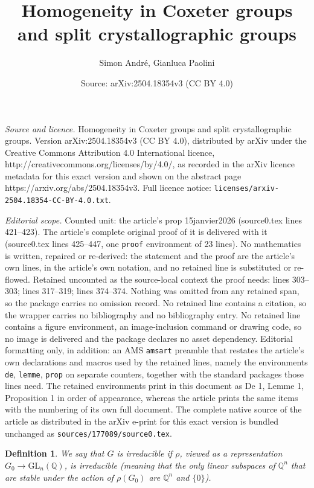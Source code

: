 \documentclass[10pt,a4paper]{amsart}
\title{Homogeneity in Coxeter groups and split crystallographic groups}
\author{Simon Andr{\' e}, Gianluca Paolini}
\date{Source: arXiv:2504.18354v3 (CC BY 4.0)}
\newtheorem{de}{Definition}
\begin{document}
\maketitle

\noindent\emph{Source and licence.} Homogeneity in Coxeter groups and split crystallographic groups. Version arXiv:2504.18354v3 (CC BY 4.0), distributed by arXiv under the Creative Commons Attribution 4.0 International licence, http://creativecommons.org/licenses/by/4.0/, as recorded in the arXiv licence metadata for this exact version and shown on the abstract page https://arxiv.org/abs/2504.18354v3. Full licence notice: \texttt{licenses/arxiv-2504.18354-CC-BY-4.0.txt}.\par\smallskip

\noindent\textit{Editorial scope.} Counted unit: the article's prop 15janvier2026 (source0.tex lines 421--423). The article's complete original proof of it is delivered with it (source0.tex lines 425--447, one \texttt{proof} environment of 23 lines). No mathematics is written, repaired or re-derived: the statement and the proof are the article's own lines, in the article's own notation, and no retained line is substituted or re-flowed.  Retained uncounted as the source-local context the proof needs: lines 303--303; lines 317--319; lines 374--374.  Nothing was omitted from any retained span, so the package carries no omission record.  No retained line contains a citation, so the wrapper carries no bibliography and no bibliography entry.  No retained line contains a figure environment, an image-inclusion command or drawing code, so no image is delivered and the package declares no asset dependency.  Editorial formatting only, in addition: an AMS \texttt{amsart} preamble that restates the article's own declarations and macros used by the retained lines, namely the environments \texttt{de}, \texttt{lemme}, \texttt{prop} on separate counters, together with the standard packages those lines need.  The retained environments print in this document as De 1, Lemme 1, Proposition 1 in order of appearance, whereas the article prints the same items with the numbering of its own full document.  The complete native source of the article as distributed in the arXiv e-print for this exact version is bundled unchanged as \texttt{sources/177089/source0.tex}.
\begin{de}\label{def_irreducible}We say that $G$ is \emph{irreducible} if $\rho$, viewed as a representation $G_0\rightarrow\mathrm{GL}_n(\mathbb{Q})$, is irreducible (meaning that the only linear subspaces of $\mathbb{Q}^n$ that are stable under the action of $\rho(G_0)$ are $\mathbb{Q}^n$ and $\lbrace 0\rbrace$).\end{de}
\end{document}
